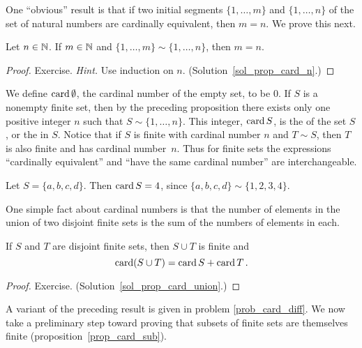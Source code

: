 One ``obvious'' result is that if two initial segments $\{1,\dots,m\}$ and $\{1,\dots,n\}$ of
the set of natural numbers are cardinally equivalent, then $m = n$. We prove this next.

\begin{prop}\label{prop_card_n}  Let $n \in \mathbb{N}$. If $m \in \mathbb{N}$ and $\{1,\dots,m\} \sim
\{1,\dots,n\}$, then $m = n$.
\end{prop}

\begin{proof} Exercise. \emph{Hint.}  Use induction on $n$.
(Solution~\ref{sol_prop_card_n}.)  \ns
\end{proof}

\begin{defn} We define
$\operatorname{card} \emptyset$, the cardinal number of the empty set, to be $0$. If $S$ is a nonempty
finite set, then by the preceding proposition there exists only one positive integer $n$ such
that $S \sim \{1,\dots,n\}$.  This integer, $\operatorname{card} S$, is the
 of the set $S$, or the  in $S$.  Notice that if
$S$ is finite with cardinal number $n$ and $T \sim S$, then $T$ is also finite and has
cardinal number~$n$. Thus for finite sets the expressions ``cardinally equivalent'' and ``have
the same cardinal number'' are interchangeable.
\end{defn}

\begin{exam} Let $S = \{a,b,c,d\}$. Then $\operatorname{card} S = 4$, since $\{a,b,c,d\} \sim \{1,2,3,4\}$.
\end{exam}

One simple fact about cardinal numbers is that the number of elements in the union of two
disjoint finite sets is the sum of the numbers of elements in each.

\begin{prop}\label{prop_card_union}  If $S$ and $T$ are disjoint finite sets, then $S \cup T$
is finite and
  \[ \operatorname{card} (S \cup T) = \operatorname{card} S + \operatorname{card} T\,. \]
\end{prop}

\begin{proof} Exercise.  (Solution~\ref{sol_prop_card_union}.)  \ns  \end{proof}

A variant of the preceding result is given in problem \ref{prob_card_diff}.  We now take a
preliminary step toward proving that subsets of finite sets are themselves finite
(proposition~\ref{prop_card_sub}).

